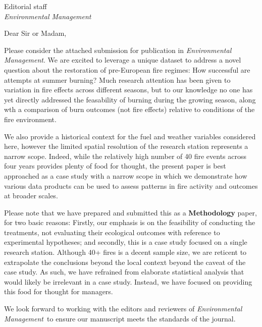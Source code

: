 \documentclass[parskip=half, 
			   fontsize=10pt,
			   paper=a4]				
{scrartcl}
\newcommand{\journal}{\emph{Environmental Management}}
\begin{document}
	\begin{letter}{Editorial staff\\
		\journal }
\setlength{\parindent}{12pt}

\opening{Dear Sir or Madam,}  
		
Please consider the attached submission for publication in \journal. 
We are excited to leverage a unique dataset to address a novel question about the restoration of pre-European fire regimes: How successful are attempts at summer burning?
Much research attention has been given to variation in fire effects across different seasons, but to our knowledge no one has yet directly addressed the feasability of burning during the growing season, along wth a comparison of burn outcomes (not fire effects) relative to conditions of the fire environment. 

We also provide a historical context for the fuel and weather variables considered here, however the limited spatial resolution of the research station represents a narrow scope. 
Indeed, while the relatively high number of 40 fire events across four years provides plenty of food for thought, the present paper is best approached as a case study with a narrow scope in which we demonstrate how various data products can be used to assess patterns in fire activity and outcomes at broader scales.  

Please note that we have prepared and submitted this as a \textbf{Methodology} paper, for two basic reasons: Firstly, our emphasis is on the feasibility of conducting the treatments, not evaluating their ecological outcomes with reference to experimental hypotheses; and secondly, this is a case study focused on a single research station. 
Although 40+ fires is a decent sample size, we are reticent to extrapolate the conclusions beyond the local context beyond the caveat of the case study. 
As such, we have refrained from elaborate statistical analysis that would likely be irrelevant in a case study. 
Instead, we have focused on providing this food for thought for managers.

We look forward to working with the editors and reviewers of \journal~to ensure our manuscript meets the standards of the journal. 

\vspace{-3em} 
\closing{} %
\end{letter}
\end{document}
